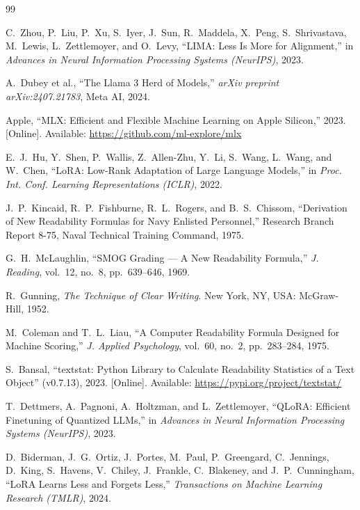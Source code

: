 \documentclass[pdflatex,sn-mathphys-num]{sn-jnl}%
\begin{document}
\begin{thebibliography}{99}

C.~Zhou, P.~Liu, P.~Xu, S.~Iyer, J.~Sun, R.~Maddela, X.~Peng, S.~Shrivastava, M.~Lewis, L.~Zettlemoyer, and O.~Levy, ``LIMA: Less Is More for Alignment,'' in \textit{Advances in Neural Information Processing Systems (NeurIPS)}, 2023.

A.~Dubey et al., ``The Llama 3 Herd of Models,'' \textit{arXiv preprint arXiv:2407.21783}, Meta AI, 2024.

Apple, ``MLX: Efficient and Flexible Machine Learning on Apple Silicon,'' 2023. [Online]. Available: \url{https://github.com/ml-explore/mlx}

E.~J.~Hu, Y.~Shen, P.~Wallis, Z.~Allen-Zhu, Y.~Li, S.~Wang, L.~Wang, and W.~Chen, ``LoRA: Low-Rank Adaptation of Large Language Models,'' in \textit{Proc. Int. Conf. Learning Representations (ICLR)}, 2022.

J.~P.~Kincaid, R.~P.~Fishburne, R.~L.~Rogers, and B.~S.~Chissom, ``Derivation of New Readability Formulas for Navy Enlisted Personnel,'' Research Branch Report 8-75, Naval Technical Training Command, 1975.

G.~H.~McLaughlin, ``SMOG Grading --- A New Readability Formula,'' \textit{J. Reading}, vol.~12, no.~8, pp.~639--646, 1969.

R.~Gunning, \textit{The Technique of Clear Writing}. New York, NY, USA: McGraw-Hill, 1952.

M.~Coleman and T.~L.~Liau, ``A Computer Readability Formula Designed for Machine Scoring,'' \textit{J. Applied Psychology}, vol.~60, no.~2, pp.~283--284, 1975.

S.~Bansal, ``textstat: Python Library to Calculate Readability Statistics of a Text Object'' (v0.7.13), 2023. [Online]. Available: \url{https://pypi.org/project/textstat/}

T.~Dettmers, A.~Pagnoni, A.~Holtzman, and L.~Zettlemoyer, ``QLoRA: Efficient Finetuning of Quantized LLMs,'' in \textit{Advances in Neural Information Processing Systems (NeurIPS)}, 2023.

D.~Biderman, J.~G.~Ortiz, J.~Portes, M.~Paul, P.~Greengard, C.~Jennings, D.~King, S.~Havens, V.~Chiley, J.~Frankle, C.~Blakeney, and J.~P.~Cunningham, ``LoRA Learns Less and Forgets Less,'' \textit{Transactions on Machine Learning Research (TMLR)}, 2024.


\end{thebibliography}
\end{document}
